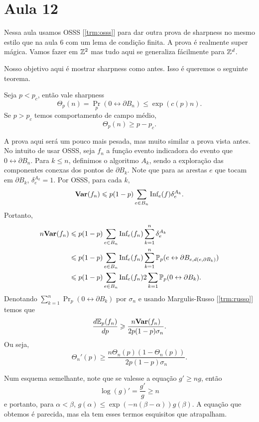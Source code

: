 \section{Aula 12}
Nessa aula usamos OSSS [\ref{trm:osss}]
para dar outra prova de sharpness no mesmo estilo que na aula 6 com
um lema de condição finita. A prova é realmente super mágica.
Vamos fazer em $\mathbb{Z}^2$ mas tudo aqui se generaliza fácilmente para $\mathbb{Z}^d$.

Nosso objetivo aqui é mostrar sharpness como antes. Isso é
queremos o seguinte teorema.
\begin{theorem}
	Seja $p < p_c$, então vale sharpness
	\[
		\Theta_p(n) = \Pr_p(0 \leftrightarrow \partial B_n) \leq \exp(c(p)n).
	\]
	Se $p > p_c$ temos comportamento de campo médio,
	\[
		\Theta_p(n) \geq p - p_c.
	\]
\end{theorem}

A prova aqui será um pouco mais pesada, mas muito similar a prova
vista antes. No intuito de usar
OSSS, seja $f_n$ a função evento indicadora do evento que $0
\leftrightarrow \partial B_n$.
Para $k \leq n$, definimos o algoritmo $A_k$, sendo a exploração das
componentes conexas dos pontos de $\partial B_k$.
Note que para as arestas $e$ que tocam em $\partial B_k$,
$\delta_{e}^{A_k} = 1$. Por OSSS, para cada $k$,
\[
	\textbf{Var}(f_n) \leqslant p(1-p)\sum_{e \in B_n} \text{Inf}_e(f) \delta_e^{A_k}.
\]
Portanto,
\begin{align*}
	n\textbf{Var}(f_n) &\leqslant p(1-p)\sum_{e \in B_n} \text{Inf}_e(f_n) \sum_{k =
	1}^n \delta_e^{A_k}\\
	&\leqslant p(1-p)\sum_{e \in B_n} \text{Inf}_e(f_n) \sum_{k = 1}^n \mathbb{P}_p(
	e \leftrightarrow \partial B_{e, d(e,\partial B_k)})\\
	&\leqslant p(1-p)\sum_{e \in B_n} \text{Inf}_e(f_n) 2 \sum_{k = 1}
	\mathbb{P}_p(0 \leftrightarrow \partial B_k).
\end{align*}
Denotando $\sum_{k = 1}^n \Pr_p(0 \leftrightarrow \partial B_k)$ por
$\sigma_n$ e usando Margulis-Russo [\ref{trm:russo}]
temos que
\[
	\frac{d \mathbb{E}_p(f_n)}{dp} \geqslant \frac{n \textbf{Var}(f_n)}{2p(1-p) \sigma_n}.
\]
Ou seja,
\[
	\Theta_n'(p) \geq \frac{n \Theta_n(p)(1 - \Theta_n(p))}{2p(1-p) \sigma_n}.
\]
\begin{remark}
	Num esquema semelhante, note que se valesse a equação $g' \geq ng$, então
	\[
		\log(g)' = \frac{g'}{g} \geq n
	\]
	e portanto, para $\alpha < \beta$, $g(\alpha) \leq \exp(-n(\beta -
	\alpha))g(\beta)$.
	A equação que obtemos é parecida, mas ela tem esses termos
	esquisitos que atrapalham.
\end{remark}

